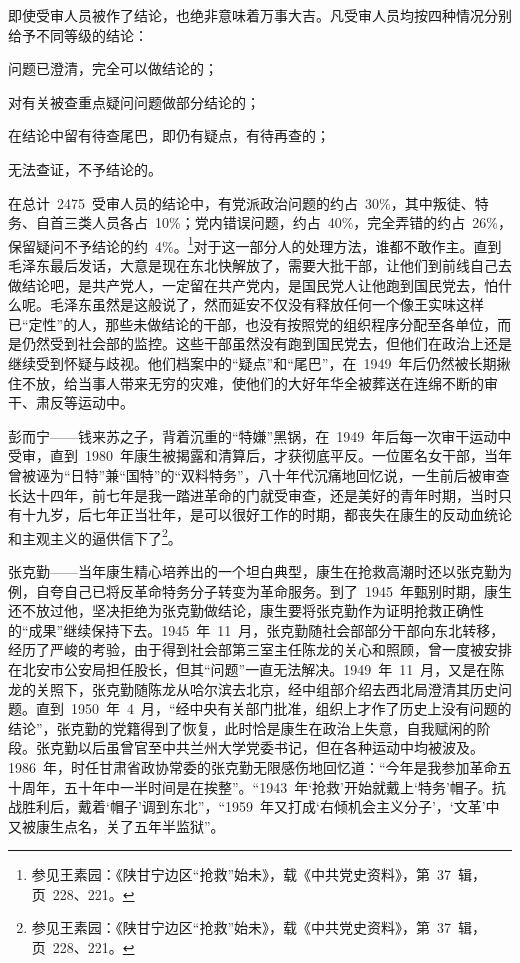 即使受审人员被作了结论，也绝非意味着万事大吉。凡受审人员均按四种情况分别给予不同等级的结论：

问题已澄清，完全可以做结论的；

对有关被查重点疑问问题做部分结论的；

在结论中留有待查尾巴，即仍有疑点，有待再查的；

无法查证，不予结论的。

在总计~2475~受审人员的结论中，有党派政治问题的约占~30\%，其中叛徒、特务、自首三类人员各占~10\%；党内错误问题，约占~40\%，完全弄错的约占~26\%，保留疑问不予结论的约~4\%。\footnote{参见王素园：《陕甘宁边区“抢救”始未》，载《中共党史资料》，第~37~辑，页~228、221。}对于这一部分人的处理方法，谁都不敢作主。直到毛泽东最后发话，大意是现在东北快解放了，需要大批干部，让他们到前线自己去做结论吧，是共产党人，一定留在共产党内，是国民党人让他跑到国民党去，怕什么呢。毛泽东虽然是这般说了，然而延安不仅没有释放任何一个像王实味这样已“定性”的人，那些未做结论的干部，也没有按照党的组织程序分配至各单位，而是仍然受到社会部的监控。这些干部虽然没有跑到国民党去，但他们在政治上还是继续受到怀疑与歧视。他们档案中的“疑点”和“尾巴”，在~1949~年后仍然被长期揪住不放，给当事人带来无穷的灾难，使他们的大好年华全被葬送在连绵不断的审干、肃反等运动中。

彭而宁——钱来苏之子，背着沉重的“特嫌”黑锅，在~1949~年后每一次审干运动中受审，直到~1980~年康生被揭露和清算后，才获彻底平反。一位匿名女干部，当年曾被诬为“日特”兼“国特”的“双料特务”，八十年代沉痛地回忆说，一生前后被审查长达十四年，前七年是我一踏进革命的门就受审查，还是美好的青年时期，当时只有十九岁，后七年正当壮年，是可以很好工作的时期，都丧失在康生的反动血统论和主观主义的逼供信下了\footnote{参见王素园：《陕甘宁边区“抢救”始未》，载《中共党史资料》，第~37~辑，页~228、221。}。

张克勤——当年康生精心培养出的一个坦白典型，康生在抢救高潮时还以张克勤为例，自夸自己已将反革命特务分子转变为革命服务。到了~1945~年甄别时期，康生还不放过他，坚决拒绝为张克勤做结论，康生要将张克勤作为证明抢救正确性的“成果”继续保持下去。1945~年~11~月，张克勤随社会部部分干部向东北转移，经历了严峻的考验，由于得到社会部第三室主任陈龙的关心和照顾，曾一度被安排在北安市公安局担任股长，但其“问题”一直无法解决。1949~年~11~月，又是在陈龙的关照下，张克勤随陈龙从哈尔滨去北京，经中组部介绍去西北局澄清其历史问题。直到~1950~年~4~月，“经中央有关部门批准，组织上才作了历史上没有问题的结论”，张克勤的党籍得到了恢复，此时恰是康生在政治上失意，自我赋闲的阶段。张克勤以后虽曾官至中共兰州大学党委书记，但在各种运动中均被波及。1986~年，时任甘肃省政协常委的张克勤无限感伤地回忆道：“今年是我参加革命五十周年，五十年中一半时间是在挨整”。“1943~年‘抢救’开始就戴上‘特务’帽子。抗战胜利后，戴着‘帽子’调到东北”，“1959~年又打成‘右倾机会主义分子’，‘文革’中又被康生点名，关了五年半监狱”。

